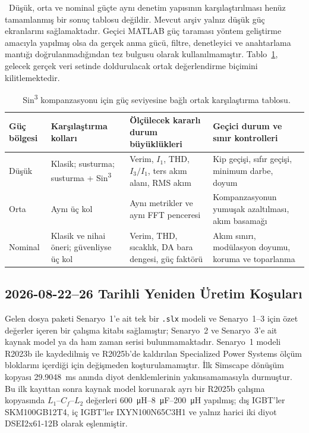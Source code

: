 \juriistegietiketi\ Düşük, orta ve nominal güçte aynı denetim yapısının karşılaştırılması henüz tamamlanmış bir sonuç tablosu değildir. Mevcut arşiv yalnız düşük güç ekranlarını sağlamaktadır. Geçici MATLAB güç taraması yöntem geliştirme amacıyla yapılmış olsa da gerçek anma gücü, filtre, denetleyici ve anahtarlama mantığı doğrulanmadığından tez bulgusu olarak kullanılmamıştır. Tablo~\ref{tab:sin3-guc-karsilastirma-plani}, gelecek gerçek veri setinde doldurulacak ortak değerlendirme biçimini kilitlemektedir.

\begin{table}[htbp]
  \centering
  \caption{\juriistegietiketi\ Sin\textsuperscript{3} kompanzasyonu için güç seviyesine bağlı ortak karşılaştırma tablosu.}
  \label{tab:sin3-guc-karsilastirma-plani}
  \small
  \begin{tabularx}{\textwidth}{p{} p{} X X}
    \toprule
    Güç bölgesi & Karşılaştırma kolları & Ölçülecek kararlı durum büyüklükleri & Geçici durum ve sınır kontrolleri \\
    \midrule
    Düşük & Klasik; susturma; susturma + Sin\textsuperscript{3} & Verim, $I_1$, THD, $I_3/I_1$, ters akım alanı, RMS akım & Kip geçişi, sıfır geçişi, minimum darbe, doyum \\
    Orta & Aynı üç kol & Aynı metrikler ve aynı FFT penceresi & Kompanzasyonun yumuşak azaltılması, akım basamağı \\
    Nominal & Klasik ve nihai öneri; güvenliyse üç kol & Verim, THD, sıcaklık, DA bara dengesi, güç faktörü & Akım sınırı, modülasyon doyumu, koruma ve toparlanma \\
    \bottomrule
  \end{tabularx}
\end{table}

\subsection{2026-08-22--26 Tarihli Yeniden Üretim Koşuları}

Gelen dosya paketi Senaryo~1'e ait tek bir \texttt{.slx} modeli ve Senaryo~1--3 için özet değerler içeren bir çalışma kitabı sağlamıştır; Senaryo~2 ve Senaryo~3'e ait kaynak model ya da ham zaman serisi bulunmamaktadır. Senaryo~1 modeli R2023b ile kaydedilmiş ve R2025b'de kaldırılan Specialized Power Systems ölçüm bloklarını içerdiği için değişmeden koşturulamamıştır. İlk Simscape dönüşüm kopyası \SI{29.9048}{\milli\second} anında diyot denklemlerinin yakınsamamasıyla durmuştur. Bu ilk kayıttan sonra kaynak model korunarak ayrı bir R2025b çalışma kopyasında $L_1$--$C_f$--$L_2$ değerleri \SI{600}{\micro\henry}--\SI{8}{\micro\farad}--\SI{200}{\micro\henry} yapılmış; dış IGBT'ler SKM100GB12T4, iç IGBT'ler IXYN100N65C3H1 ve yalnız harici iki diyot DSEI2x61-12B olarak eşlenmiştir.

